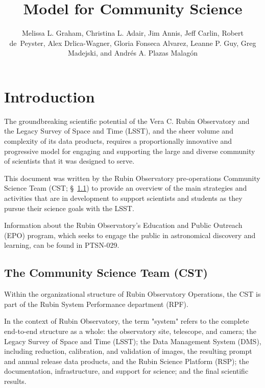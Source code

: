 \documentclass[DM,authoryear,toc]{lsstdoc}
\title{Model for Community Science}
\author{%
Melissa L. Graham, Christina L. Adair, Jim Annis, Jeff Carlin, Robert de~Peyster, Alex Drlica-Wagner, Gloria Fonseca Alvarez, Leanne P. Guy, Greg Madejski, and Andr\'es A. Plazas Malag\'on
}
\date{\vcsDate}
\begin{document}
\maketitle



\section{Introduction}\label{sec:intro}

The groundbreaking scientific potential of the Vera C. Rubin Observatory and the Legacy Survey of Space and Time (LSST), and the sheer volume and complexity of its data products, requires a proportionally innovative and progressive model for engaging and supporting the large and diverse community of scientists that it was designed to serve. 

This document was written by the Rubin Observatory pre-operations Community Science Team (CST; \S~\ref{sec:intro_org}) to provide an overview of the main strategies and activities that are in development to support scientists and students as they pursue their science goals with the LSST. 

Information about the Rubin Observatory's Education and Public Outreach (EPO) program, which seeks to engage the public in astronomical discovery and learning, can be found in PTSN-029. %


\subsection{The Community Science Team (CST)}\label{sec:intro_org}

Within the organizational structure of Rubin Observatory Operations, the CST is part of the Rubin System Performance department (RPF).

In the context of Rubin Observatory, the term "system" refers to the complete end-to-end structure as a whole: the observatory site, telescope, and camera; the Legacy Survey of Space and Time (LSST); the Data Management System (DMS), including reduction, calibration, and validation of images, the resulting prompt and annual release data products, and the Rubin Science Platform (RSP); the documentation, infrastructure, and support for science; and the final scientific results. 
\end{document}
